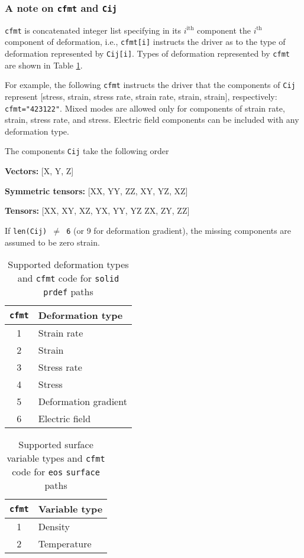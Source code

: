 \documentclass[11pt]{report}
\begin{document}
\subsubsection{A note on \texttt{cfmt} and \texttt{Cij}}
\texttt{cfmt} is concatenated integer list specifying in its $i^\text{ith}$
component the $i^\text{th}$ component of deformation, i.e., \texttt{cfmt[i]}
instructs the driver as to the type of deformation represented by
\texttt{Cij[i]}.  Types of deformation represented by \texttt{cfmt} are shown
in Table \ref{tab:cfmt}.

For example, the following \texttt{cfmt} instructs the driver that the
components of \texttt{Cij} represent [stress, strain, stress rate, strain
rate, strain, strain], respectively: \verb:cfmt="423122":. Mixed modes are
allowed only for components of strain rate, strain, stress rate, and stress.
Electric field components can be included with any deformation type.

The components \texttt{Cij} take the following order

\textbf{Vectors:} [X, Y, Z]

\textbf{Symmetric tensors:} [XX, YY, ZZ, XY, YZ, XZ]

\textbf{Tensors:} [XX, XY, XZ, YX, YY, YZ ZX, ZY, ZZ]

If \texttt{len(Cij) $\neq$ 6} (or 9 for deformation gradient), the missing
components are assumed to be zero strain.

\begin{table}[h!]
  \centering
  \begin{tabular}[h]{cl}
    \hline
    \hline
    \texttt{cfmt} & Deformation type \\
    \hline
    1 & Strain rate \\
    2 & Strain \\
    3 & Stress rate \\
    4 & Stress \\
    5 & Deformation gradient \\
    6 & Electric field
  \end{tabular}
  \caption{Supported deformation types and \texttt{cfmt} code for
    \texttt{solid} \texttt{prdef} paths}
  \label{tab:cfmt}
\end{table}

\begin{table}[h!]
  \centering
  \begin{tabular}[h]{cl}
    \hline
    \hline
    \texttt{cfmt} & Variable type \\
    \hline
    1 & Density \\
    2 & Temperature
  \end{tabular}
  \caption{Supported surface variable types and \texttt{cfmt} code for
    \texttt{eos} \texttt{surface} paths}
  \label{tab:cfmt-1}
\end{table}
\end{document}
